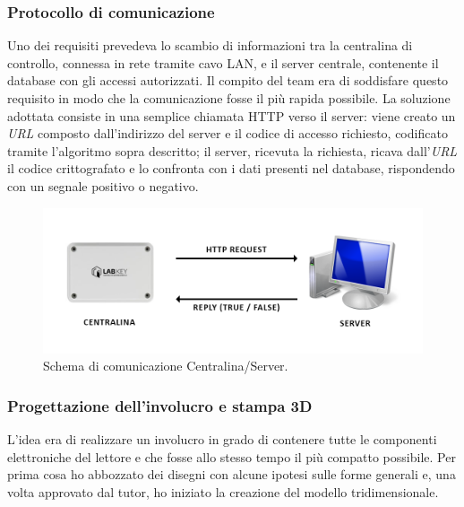 \subsubsection{Protocollo di comunicazione}
Uno dei requisiti prevedeva lo scambio di informazioni tra la centralina di controllo, connessa in rete tramite cavo LAN, e il server centrale, contenente il database con gli accessi autorizzati.
Il compito del team era di soddisfare questo requisito in modo che la comunicazione fosse il più rapida possibile.
La soluzione adottata consiste in una semplice chiamata HTTP verso il server: viene creato un \textit{URL} composto dall'indirizzo del server e il codice di accesso richiesto, codificato tramite l'algoritmo sopra descritto; il server, ricevuta la richiesta, ricava dall'\textit{URL} il codice crittografato e lo confronta con i dati presenti nel database, rispondendo con un segnale positivo o negativo.

\begin{figure}[H]
	\begin{center}
	\includegraphics[scale=0.37]{immagini/comunicazione_http.png}
	\caption{Schema di comunicazione Centralina/Server.}
	\end{center}
\end{figure}

\subsubsection{Progettazione dell'involucro e stampa 3D}
L'idea era di realizzare un involucro in grado di contenere tutte le componenti elettroniche del lettore e che fosse allo stesso tempo il più compatto possibile.
Per prima cosa ho abbozzato dei disegni con alcune ipotesi sulle forme generali e, una volta approvato dal tutor, ho iniziato la creazione del modello tridimensionale.


